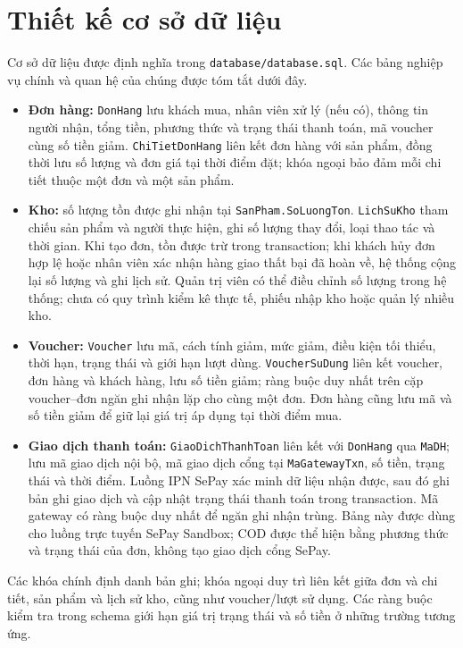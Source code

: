 \section{Thiết kế cơ sở dữ liệu}
Cơ sở dữ liệu được định nghĩa trong \texttt{database/database.sql}. Các bảng nghiệp vụ chính và quan hệ của chúng được tóm tắt dưới đây.

\begin{itemize}
    \item \textbf{Đơn hàng:} \texttt{DonHang} lưu khách mua, nhân viên xử lý (nếu có), thông tin người nhận, tổng tiền, phương thức và trạng thái thanh toán, mã voucher cùng số tiền giảm. \texttt{ChiTietDonHang} liên kết đơn hàng với sản phẩm, đồng thời lưu số lượng và đơn giá tại thời điểm đặt; khóa ngoại bảo đảm mỗi chi tiết thuộc một đơn và một sản phẩm.
    \item \textbf{Kho:} số lượng tồn được ghi nhận tại \texttt{SanPham.SoLuongTon}. \texttt{LichSuKho} tham chiếu sản phẩm và người thực hiện, ghi số lượng thay đổi, loại thao tác và thời gian. Khi tạo đơn, tồn được trừ trong transaction; khi khách hủy đơn hợp lệ hoặc nhân viên xác nhận hàng giao thất bại đã hoàn về, hệ thống cộng lại số lượng và ghi lịch sử. Quản trị viên có thể điều chỉnh số lượng trong hệ thống; chưa có quy trình kiểm kê thực tế, phiếu nhập kho hoặc quản lý nhiều kho.
    \item \textbf{Voucher:} \texttt{Voucher} lưu mã, cách tính giảm, mức giảm, điều kiện tối thiểu, thời hạn, trạng thái và giới hạn lượt dùng. \texttt{VoucherSuDung} liên kết voucher, đơn hàng và khách hàng, lưu số tiền giảm; ràng buộc duy nhất trên cặp voucher--đơn ngăn ghi nhận lặp cho cùng một đơn. Đơn hàng cũng lưu mã và số tiền giảm để giữ lại giá trị áp dụng tại thời điểm mua.
    \item \textbf{Giao dịch thanh toán:} \texttt{GiaoDichThanhToan} liên kết với \texttt{DonHang} qua \texttt{MaDH}; lưu mã giao dịch nội bộ, mã giao dịch cổng tại \texttt{MaGatewayTxn}, số tiền, trạng thái và thời điểm. Luồng IPN SePay xác minh dữ liệu nhận được, sau đó ghi bản ghi giao dịch và cập nhật trạng thái thanh toán trong transaction. Mã gateway có ràng buộc duy nhất để ngăn ghi nhận trùng. Bảng này được dùng cho luồng trực tuyến SePay Sandbox; COD được thể hiện bằng phương thức và trạng thái của đơn, không tạo giao dịch cổng SePay.
\end{itemize}

Các khóa chính định danh bản ghi; khóa ngoại duy trì liên kết giữa đơn và chi tiết, sản phẩm và lịch sử kho, cũng như voucher/lượt sử dụng. Các ràng buộc kiểm tra trong schema giới hạn giá trị trạng thái và số tiền ở những trường tương ứng.

